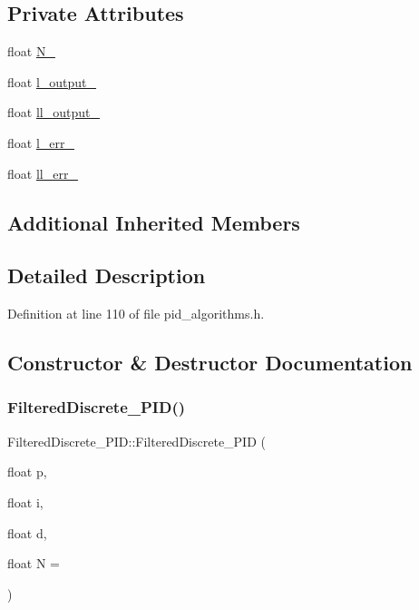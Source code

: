 \subsection*{Private Attributes}
\begin{DoxyCompactItemize}
\item 
float \mbox{\hyperlink{class_filtered_discrete___p_i_d_a491d8d01f3196ce37ccd51b1710925e6}{N\+\_\+}}
\item 
float \mbox{\hyperlink{class_filtered_discrete___p_i_d_ac6562f9f1686366da268e34adfb02e48}{l\+\_\+output\+\_\+}}
\item 
float \mbox{\hyperlink{class_filtered_discrete___p_i_d_a3c18ed8624221fe9c6b343681d6688fe}{ll\+\_\+output\+\_\+}}
\item 
float \mbox{\hyperlink{class_filtered_discrete___p_i_d_ae081b8ac8ee32207d5fb130d5b51d8f3}{l\+\_\+err\+\_\+}}
\item 
float \mbox{\hyperlink{class_filtered_discrete___p_i_d_a3ccaf2b9119f403a65908915340f56e9}{ll\+\_\+err\+\_\+}}
\end{DoxyCompactItemize}
\subsection*{Additional Inherited Members}


\subsection{Detailed Description}


Definition at line 110 of file pid\+\_\+algorithms.\+h.



\subsection{Constructor \& Destructor Documentation}
\mbox{\label{class_filtered_discrete___p_i_d_a9cc44afe9d0209b34c760a2512a6d290}} 
\subsubsection{\texorpdfstring{FilteredDiscrete\_PID()}{FilteredDiscrete\_PID()}\hspace{0.1cm}{\footnotesize\ttfamily [1/4]}}
{\footnotesize\ttfamily Filtered\+Discrete\+\_\+\+P\+I\+D\+::\+Filtered\+Discrete\+\_\+\+P\+ID (\begin{DoxyParamCaption}\item[{float}]{p,  }\item[{float}]{i,  }\item[{float}]{d,  }\item[{float}]{N = {} }\end{DoxyParamCaption})\hspace{0.3cm}{\ttfamily [inline]}}



